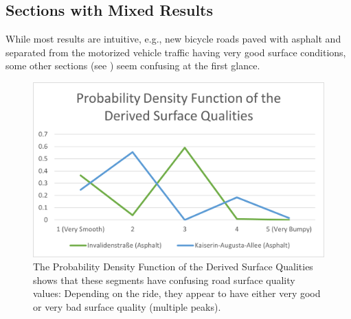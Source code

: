 \begin{table}%
\centering
\caption{Surface Quality Analysis Evaluation Results Showing Mean, Median and Standard Deviation of Sections With Clear Results}%
\label{tab:clear}
\end{table}

\subsection{Sections with Mixed Results}
\label{subsec:sections_with_mixed_results}
While most results are intuitive, e.g., new bicycle roads paved with asphalt and separated from the motorized vehicle traffic having very good surface conditions, some other sections (see ) seem confusing at the first glance.

\begin{figure}
    \centering
    \includegraphics[width=0.7\columnwidth]{fig/pdf_mixed.png}
    \caption{%
        The Probability Density Function of the Derived Surface Qualities shows that these segments have confusing road surface quality values: Depending on the ride, they appear to have either very good or very bad surface quality (multiple peaks).
    }%
    \label{fig:mixed}
\end{figure}

